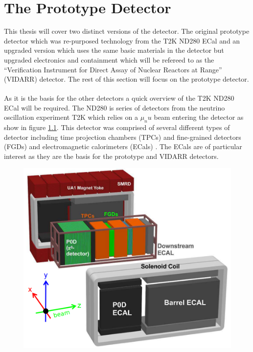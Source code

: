 
\chapter{The Prototype Detector}\label{Chp:ThePrototypeDetector}

\ifpdf
    \graphicspath{{Chapter2/Figs/Raster/}{Chapter2/Figs/PDF/}{Chapter2/Figs/}}
\else
    \graphicspath{{Chapter2/Figs/Vector/}{Chapter2/Figs/}}
\fi


This thesis will cover two distinct versions of the detector. The original prototype detector which was re-purposed technology from the T2K ND280 ECal \cite{Allan_2013} and an upgraded version which uses the same basic materials in the detector but upgraded electronics and containment which will be refereed to as the ``Verification Instrument for Direct Assay of Nuclear Reactors at Range'' (VIDARR) detector. The rest of this section will focus on the prototype detector.
\\\\As it is the basis for the other detectors a quick overview of the T2K ND280 ECal will be required. The ND280 is series of detectors from the neutrino oscillation experiment T2K which relies on a $\mu_nu$ beam entering the detector as show in figure \ref{fig:nd280Fig}. This detector was comprised of several different types of detector including time projection chambers (TPCs) and fine-grained detectors (FGDs) and electromagnetic calorimeters (ECals) \cite{Allan_2013}. The ECals are of particular interest as they are the basis for the prototype and VIDARR detectors. 
\begin{figure}[H]
 \centering
 \includegraphics[width=\linewidth/2]{ND280Fig.png} 
 \label{fig:nd280Fig}
\end{figure}
